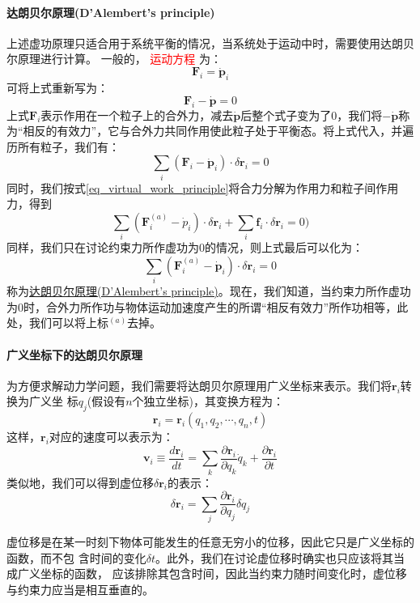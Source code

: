 \paragraph*{达朗贝尔原理(D'Alembert's principle)}
上述虚功原理只适合用于系统平衡的情况，当系统处于运动中时，需要使用达朗贝尔原理进行计算。
一般的，\textcolor{red}{ 运动方程 }为：
\begin{equation*}
	\bm{F}_i = \dot{\bm{p}}_i
\end{equation*} 
可将上式重新写为：
\begin{equation*}
	\bm{F}_i - \dot{\bm{p}} = 0
\end{equation*}
上式$\bm{F}_i$表示作用在一个粒子上的合外力，减去$\dot{\bm{p}}$后整个式子变为了0，我们将$-\dot{\bm{p}}$称为“相反的有效力”，它与合外力共同作用使此粒子处于平衡态。将上式代入，并遍历所有粒子，我们有：
\begin{equation}
	\sum_{i}(\bm{F}_i - \dot{\bm{p}}_i) \cdot \delta \bm{r}_i = 0
\end{equation} 
同时，我们按式\eqref{eq_virtual_work_principle}将合力分解为作用力和粒子间作用力，得到
\begin{equation*}
	\sum_i (\bm{F}^{(a)}_i - \dot{p}_i) \cdot \delta \bm{r}_i + \sum_i \bm{f}_i \cdot \delta \bm{r}_i = 0)
\end{equation*} 
同样，我们只在讨论约束力所作虚功为0的情况，则上式最后可以化为：
\begin{equation}
	\sum_i (\bm{F}^{(a)}_{i} - \dot{\bm{p}}_i) \cdot \delta \bm{r}_i = 0	\label{eq:dalember_principle}
\end{equation} 
称为\underline{达朗贝尔原理(D'Alembert's principle)}。现在，我们知道，当约束力所作虚功为0时，合外力所作功与物体运动加速度产生的所谓“相反有效力”所作功相等，此处，我们可以将上标$^{(a)}$去掉。

\paragraph*{广义坐标下的达朗贝尔原理}
为方便求解动力学问题，我们需要将达朗贝尔原理用广义坐标来表示。我们将$\bm{r}_i$转换为广义坐
标$q_{j}$(假设有$n$个独立坐标)，其变换方程为：
\begin{equation*}
	\bm{r}_i = \bm{r}_i(q_1, q_2, \cdots , q_n, t)
\end{equation*} 
这样，$\bm{r}_i$对应的速度可以表示为：
\begin{equation}
	\bm{v}_i \equiv \frac{d\bm{r}_i}{dt} = \sum_k \frac{\partial \bm{r}_i}{\partial q_k}\dot{q}_k + \frac{\partial \bm{r}_i}{\partial t}
	\label{eq:velocity-gener-coord}
\end{equation} 
类似地，我们可以得到虚位移$\delta\bm{r}_i$的表示：
\begin{equation}
	\delta\bm{r}_i = \sum_j \frac{\partial \bm{r}_i}{\partial q_j}\delta q_j
	\label{eq:virtual-displace-expand}
\end{equation} 
\begin{note}
	虚位移是在某一时刻下物体可能发生的任意无穷小的位移，因此它只是广义坐标的函数，而不包
    含时间的变化$\delta t$。此外，我们在讨论虚位移时确实也只应该将其当成广义坐标的函数，
    应该排除其包含时间，因此当约束力随时间变化时，虚位移与约束力应当是相互垂直的。
\end{note}

